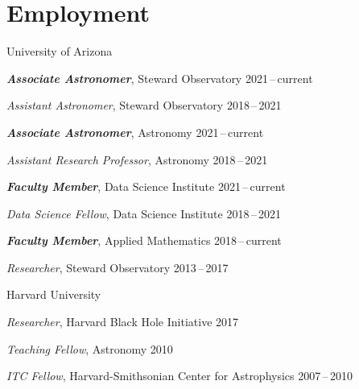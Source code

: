 \section*{Employment}

\noindent
University of Arizona
\vspace{3pt}
\begin{blist}
\item[] \textbf{\textit{Associate Astronomer}}, Steward Observatory \hfill 2021\,--\,current
\item[] \textit{Assistant Astronomer},          Steward Observatory \hfill 2018\,--\,2021
\item[] \textbf{\textit{Associate Astronomer}}, Astronomy           \hfill 2021\,--\,current
\item[] \textit{Assistant Research Professor},  Astronomy           \hfill 2018\,--\,2021
\item[] \textbf{\textit{Faculty Member}}, Data Science Institute    \hfill 2021\,--\,current
\item[] \textit{Data Science Fellow}, Data Science Institute        \hfill 2018\,--\,2021
\item[] \textbf{\textit{Faculty Member}}, Applied Mathematics       \hfill 2018\,--\,current
\item[] \textit{Researcher}, Steward Observatory                    \hfill 2013\,--\,2017
\end{blist}
\vspace{3pt}

\noindent
Harvard University
\vspace{3pt}
\begin{blist}
\item[] \textit{Researcher},      Harvard Black Hole Initiative               \hfill 2017
\item[] \textit{Teaching Fellow}, Astronomy                                   \hfill 2010
\item[] \textit{ITC Fellow},      Harvard-Smithsonian Center for Astrophysics \hfill 2007\,--\,2010
\end{blist}
\vspace{3pt}

